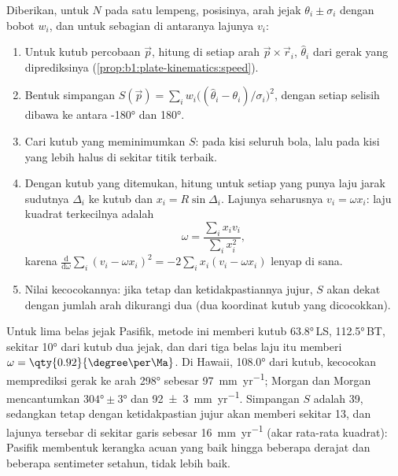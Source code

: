 \begin{method}\label{met:b1:hotspots:pole-fit}
Diberikan, untuk $N$  pada satu lempeng, posisinya, arah jejak
$\theta_i \pm \sigma_i$ dengan bobot $w_i$, dan untuk sebagian di antaranya lajunya
$v_i$:
\begin{enumerate}
  \item Untuk kutub percobaan $\vec p$, hitung di setiap  arah $\vec p\times\vec r_i$,
         $\hat\theta_i$ dari gerak yang diprediksinya
        (\cref{prop:b1:plate-kinematics:speed}).
  \item Bentuk simpangan $S(\vec p) = \sum_i w_i\bigl((\hat\theta_i -
        \theta_i)/\sigma_i\bigr)^2$, dengan setiap selisih dibawa ke antara
        \ang{-180} dan \ang{180}.
  \item Cari kutub yang meminimumkan $S$: pada kisi seluruh bola, lalu pada kisi yang lebih
        halus di sekitar titik terbaik.
  \item Dengan kutub yang ditemukan, hitung untuk setiap  yang punya laju jarak sudutnya
        $\Delta_i$ ke kutub dan $x_i = R\sin\Delta_i$. Lajunya seharusnya $v_i = \omega x_i$:
        laju kuadrat terkecilnya adalah
        \[
          \omega = \frac{\sum_i x_i v_i}{\sum_i x_i^2},
        \]
        karena $\frac{\mathrm d}{\mathrm d\omega}\sum_i (v_i - \omega x_i)^2 =
        -2\sum_i x_i(v_i - \omega x_i)$ lenyap di sana.
  \item Nilai kecocokannya: jika  tetap dan ketidakpastiannya jujur, $S$ akan dekat dengan
        jumlah arah dikurangi dua (dua koordinat kutub yang dicocokkan).
\end{enumerate}
\end{method}

Untuk lima belas jejak Pasifik, metode ini memberi kutub \ang{63.8}\,LS,
\ang{112.5}\,BT, sekitar \ang{10} dari kutub dua jejak, dan dari tiga belas laju itu memberi
$\omega = \qty{0.92}{\degree\per\Ma}$. Di Hawaii, \ang{108.0} dari kutub, kecocokan
memprediksi gerak ke arah \ang{298} sebesar \qty{97}{mm.yr^{-1}}; Morgan dan Morgan mencantumkan
$\ang{304}\pm\ang{3}$ dan \qty[uncertainty-mode=separate]{92 \pm 3}{mm.yr^{-1}}. Simpangan $S$
adalah 39, sedangkan  tetap dengan ketidakpastian jujur akan memberi sekitar 13, dan lajunya
tersebar di sekitar garis sebesar \qty{16}{mm.yr^{-1}} (akar rata-rata kuadrat):  Pasifik
membentuk kerangka acuan yang baik hingga beberapa derajat dan beberapa sentimeter setahun,
tidak lebih baik.

